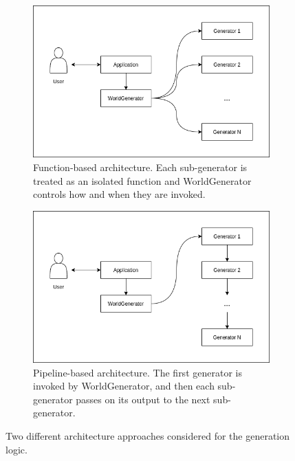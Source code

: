 \begin{figure}[h!]
  \centering
  \begin{subfigure}[b]{0.48\textwidth}
    \includegraphics[width=\textwidth]{figure/architecture_functions.png}
    \caption{Function-based architecture. Each sub-generator is treated as an isolated function and WorldGenerator controls how and when they are invoked.}
  \end{subfigure}
  \quad
  \begin{subfigure}[b]{0.48\textwidth}
    \includegraphics[width=\textwidth]{figure/architecture_pipeline.png}
    \caption{Pipeline-based architecture. The first generator is invoked by WorldGenerator, and then each sub-generator passes on its output to the next sub-generator.}
  \end{subfigure}

  \caption{Two different architecture approaches considered for the generation logic.}
  \label{fig:architecture_approaches}
\end{figure}

